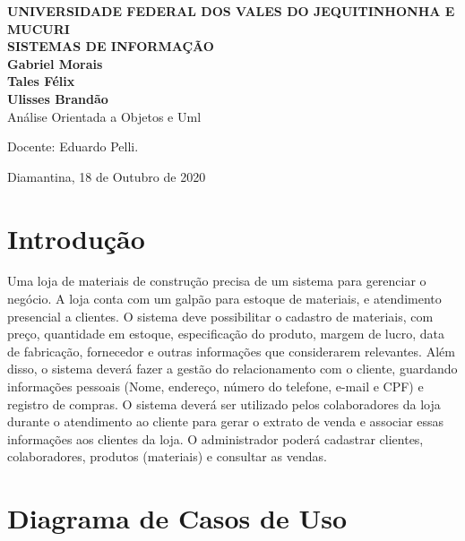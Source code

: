 \documentclass[12pt]{report}
\begin{document}
\pagestyle{empty}
\begin{titlepage}
  \vfill
    \begin{center}
      {\large \textbf{UNIVERSIDADE FEDERAL DOS VALES DO JEQUITINHONHA E MUCURI}} \\[0.5cm]
      {\large \textbf{SISTEMAS DE INFORMAÇÃO}} \\[2cm]

      {\large \textbf{Gabriel Morais}}\\[0.4cm]
      {\large \textbf{Tales Félix}}\\[0.4cm]
      {\large \textbf{Ulisses Brandão}}\\[4cm]
  
      {\Large Análise Orientada a Objetos e Uml}\\[4cm]
  
      \hspace{.45\textwidth} %
      \begin{minipage}{.5\textwidth}
      \large
      Docente: Eduardo Pelli.\\[8cm]
  \end{minipage}
  {\large Diamantina, 18 de Outubro de 2020}
  \end{center}
\end{titlepage}

\newpage
\section{Introdução}
Uma loja de materiais de construção precisa de um sistema para gerenciar
o negócio. A loja conta com um galpão para estoque de materiais, e atendimento
presencial a clientes. O sistema deve possibilitar o cadastro de materiais,
com preço, quantidade em estoque, especificação do produto, margem de lucro,
data de fabricação, fornecedor e outras informações que considerarem relevantes.
Além disso, o sistema deverá fazer a gestão do relacionamento com o cliente,
guardando informações pessoais (Nome, endereço, número do telefone, e-mail e CPF)
e registro de compras. O sistema deverá ser utilizado pelos colaboradores da
loja durante o atendimento ao cliente para gerar o extrato de venda e associar
essas informações aos clientes da loja. O administrador poderá cadastrar
clientes, colaboradores, produtos (materiais) e consultar as vendas.



\section{Diagrama de Casos de Uso}
\end{document}
